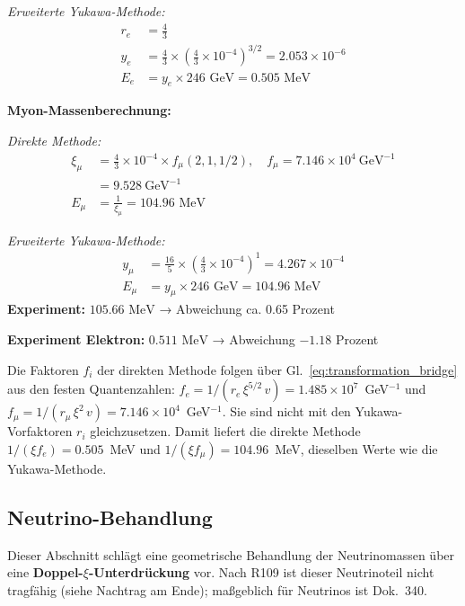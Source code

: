 \textit{Erweiterte Yukawa-Methode:}
\begin{align}
	r_e &= \frac{4}{3} \\
	y_e &= \frac{4}{3} \times \left(\frac{4}{3} \times 10^{-4}\right)^{3/2} = 2.053 \times 10^{-6} \\
	E_e &= y_e \times 246 \text{ GeV} = 0.505 \text{ MeV}
\end{align}

\textbf{Myon-Massenberechnung:}

\textit{Direkte Methode:}
\begin{align}
			\xi_\mu &= \frac{4}{3} \times 10^{-4} \times f_\mu(2,1,1/2), \quad f_\mu = 7.146 \times 10^{4}\ \text{GeV}^{-1} \\
		&= 9.528\ \text{GeV}^{-1} \\
		E_{\mu} &= \frac{1}{\xi_\mu} = 104.96 \text{ MeV}
\end{align}

\textit{Erweiterte Yukawa-Methode:}
\begin{align}
	y_\mu &= \frac{16}{5} \times \left(\frac{4}{3} \times 10^{-4}\right)^1 = 4.267 \times 10^{-4} \\
	E_\mu &= y_\mu \times 246 \text{ GeV} = 104.96 \text{ MeV}
\end{align}
\textbf{Experiment:} $105.66 \text{ MeV}$ → Abweichung ca. 0.65 Prozent

\textbf{Experiment Elektron:} $0.511 \text{ MeV}$ → Abweichung $-1.18$ Prozent

Die Faktoren $f_i$ der direkten Methode folgen über Gl.~\ref{eq:transformation_bridge} aus den festen Quantenzahlen: $f_e = 1/(r_e\,\xi^{5/2}\,v) = 1.485 \times 10^7$~GeV$^{-1}$ und $f_\mu = 1/(r_\mu\,\xi^{2}\,v) = 7.146 \times 10^4$~GeV$^{-1}$. Sie sind nicht mit den Yukawa-Vorfaktoren $r_i$ gleichzusetzen. Damit liefert die direkte Methode $1/(\xi f_e) = 0.505$~MeV und $1/(\xi f_\mu) = 104.96$~MeV, dieselben Werte wie die Yukawa-Methode.

\subsection{Neutrino-Behandlung}
\label{sec:complete_neutrino_treatment}

\begin{neutrino}
	Dieser Abschnitt schlägt eine geometrische Behandlung der Neutrinomassen über eine \textbf{Doppel-$\xi$-Unterdrückung} vor. Nach R109 ist dieser Neutrinoteil nicht tragfähig (siehe Nachtrag am Ende); maßgeblich für Neutrinos ist Dok.~340.
\end{neutrino}

